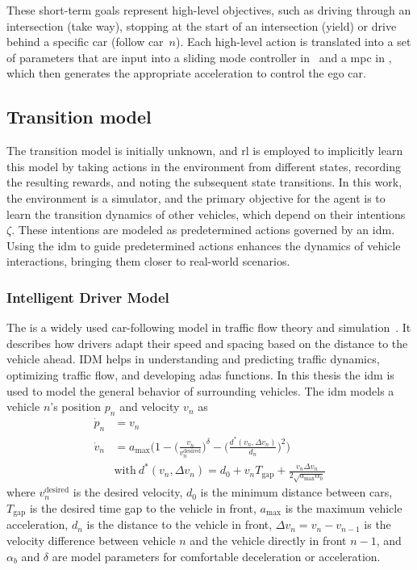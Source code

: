These short-term goals represent high-level objectives, such as driving through an intersection (take way), stopping at the start of an intersection (yield) or drive behind a specific car (follow car~$n$). Each high-level action is translated into a set of parameters that are input into a sliding mode controller in \paperLSTM \ and a \gls{mpc} in \paperMPC, which then generates the appropriate acceleration to control the ego car.

\subsection{Transition model}
\label{sec:pomdp_transistionmodel}
The transition model is initially unknown, and \gls{rl} is employed to implicitly learn this model by taking actions in the environment from different states, recording the resulting rewards, and noting the subsequent state transitions. In this work, the environment is a simulator, and the primary objective for the agent is to learn the transition dynamics of other vehicles, which depend on their intentions $\zeta$. These intentions are modeled as predetermined actions governed by an \gls{idm}. Using the \gls{idm} to guide predetermined actions enhances the dynamics of vehicle interactions, bringing them closer to real-world scenarios. 

\subsubsection{Intelligent Driver Model}
\label{ch:idm}
The  is a widely used car-following model in traffic flow theory and simulation~\cite{idm2000}. It describes how drivers adapt their speed and spacing based on the distance to the vehicle ahead. IDM helps in understanding and predicting traffic dynamics, optimizing traffic flow, and developing \gls{adas} functions. In this thesis the \gls{idm} is used to model the general behavior of surrounding vehicles.
The \gls{idm} models a vehicle $n$'s position $p_n$ and velocity $v_n$ as
\begin{align}
    \dot p_n & = v_n\\
    \dot v_n & = a_{\mathrm{max}}\Big(1-\Big(\frac{v_n}{v^\mathrm{desired}_n}\Big)^\delta-\Big( \frac{d^*(v_n,\Delta v_n)}{d_n}\Big)^2\Big) \label{eq:idm} \\
    & \mathrm{with ~} d^*(v_n, \Delta v_n) = d_0 + v_n T_{\mathrm{gap}} + \frac{v_n \Delta v_n}{2 \sqrt{a_{\mathrm{max}} \alpha_b}} \nonumber
\end{align}
where $v^\mathrm{desired}_n$ is the desired velocity, $d_0$ is the minimum distance between cars, $T_{\mathrm{gap}}$ is the desired time gap to the vehicle in front, $a_\mathrm{max}$ is the maximum vehicle acceleration, $d_n$ is the distance to the vehicle in front, $\Delta v_n = v_n - v_{n-1}$ is the velocity difference between vehicle $n$ and the vehicle directly in front $n-1$, and $\alpha_b$ and $\delta$ are model parameters for comfortable deceleration or acceleration.

